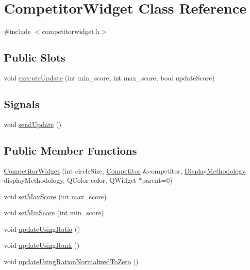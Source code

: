 \hypertarget{class_competitor_widget}{
\section{CompetitorWidget Class Reference}
\label{class_competitor_widget}
}


{\ttfamily \#include $<$competitorwidget.h$>$}

\subsection*{Public Slots}
\begin{DoxyCompactItemize}
\item 
void \hyperlink{class_competitor_widget_a92ca3213de6dd2fa310cb4cd2b709422}{executeUpdate} (int min\_\-score, int max\_\-score, bool updateScore)
\end{DoxyCompactItemize}
\subsection*{Signals}
\begin{DoxyCompactItemize}
\item 
void \hyperlink{class_competitor_widget_abcad447a64b4f728cce7c6bee676fd0b}{sendUpdate} ()
\end{DoxyCompactItemize}
\subsection*{Public Member Functions}
\begin{DoxyCompactItemize}
\item 
\hyperlink{class_competitor_widget_a17095373d11b29b5d3fa03f4ed54db32}{CompetitorWidget} (int circleSize, \hyperlink{class_competitor}{Competitor} \&competitor, \hyperlink{guicommon_8h_ab73f4a618a1a86d78e9cc82ff1c376df}{DisplayMethodology} displayMethodology, QColor color, QWidget $\ast$parent=0)
\item 
void \hyperlink{class_competitor_widget_ad0c35ac6b0e2a2b7507f1ce41a956c5b}{setMaxScore} (int max\_\-score)
\item 
void \hyperlink{class_competitor_widget_a9692e0db6844444a82c857a767781a3e}{setMinScore} (int min\_\-score)
\item 
void \hyperlink{class_competitor_widget_a72aa5486d6b0b7c2f1ef127d8a663661}{updateUsingRatio} ()
\item 
void \hyperlink{class_competitor_widget_acbcc082639251e7107a738bca6b97190}{updateUsingRank} ()
\item 
void \hyperlink{class_competitor_widget_a0700b92a8a5e76a8f01e358ecbd52f3b}{updateUsingRationNormalizedToZero} ()
\end{DoxyCompactItemize}


